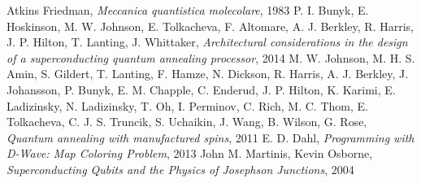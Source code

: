 \newpage
\begin{thebibliography}{99}
   Atkins Friedman, \textit{Meccanica quantistica molecolare}, 1983
   P. I. Bunyk, E. Hoskinson, M. W. Johnson, E. Tolkacheva, F. Altomare, A. J. Berkley, R. Harris, J. P. Hilton, T. Lanting, J. Whittaker, \textit{Architectural considerations in the design of a superconducting quantum annealing processor}, 2014
   M. W. Johnson, M. H. S. Amin, S. Gildert, T. Lanting, F. Hamze, N. Dickson, R. Harris, A. J. Berkley, J. Johansson, P. Bunyk, E. M. Chapple, C. Enderud, J. P. Hilton, K. Karimi, E. Ladizinsky, N. Ladizinsky, T. Oh, I. Perminov, C. Rich, M. C. Thom, E. Tolkacheva, C. J. S. Truncik, S. Uchaikin, J. Wang, B. Wilson, G. Rose, \textit{Quantum annealing with manufactured spins}, 2011
   E. D. Dahl, \textit{Programming with D-Wave: Map Coloring Problem}, 2013
   John M. Martinis, Kevin Osborne, \textit{Superconducting Qubits and the Physics of
Josephson Junctions}, 2004
\end{thebibliography}
